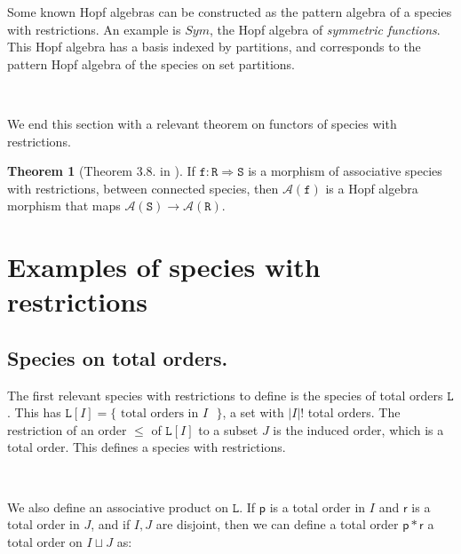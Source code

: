 \documentclass[12pt, reqno]{amsart}
\theoremstyle{definition}
\newtheorem{thm}{Theorem}[section]
\newcommand{\prR}{\mathtt{R}}
\begin{document}
Some known Hopf algebras can be constructed as the pattern algebra of a species with restrictions.
An example is $Sym$, the Hopf algebra of \textit{symmetric functions}.
This Hopf algebra has a basis indexed by partitions, and corresponds to the pattern Hopf algebra of the species on set partitions.

\

We end this section with a relevant theorem on functors of species with restrictions.

\begin{thm}[Theorem 3.8. in \cite{Penaguiao2020}]\label{thm:functoriality}
    If $\mathtt{f} : \prR \Rightarrow \mathtt{S}$ is a morphism of associative species with restrictions, between connected species, then $\mathcal A(\mathtt{f})$ is a Hopf algebra morphism that maps $\mathcal A(\mathtt{S}) \to \mathcal A(\mathtt{R})$.
\end{thm}

\section{Examples of species with restrictions \label{sec:species_restrictions}}

\subsection{Species on total orders.\label{sec:specieslinearorders}}

The first relevant species with restrictions to define is the species of total orders $\mathtt{L}$.
This has $\mathtt{L}[I] = \{\text{ total orders in $I$ }\}$, a set with $|I|!$ total orders.
The restriction of an order $\leq $ of $\mathtt{L}[I]$ to a subset $J$ is the induced order, which is a total order.
This defines a species with restrictions.

\

We also define an associative product on $\mathtt{L}$.
If $\mathsf{p}$ is a total order in $I$ and $\mathsf{r}$ is a total order in $J$, and if $I, J$ are disjoint, then we can define a total order $\mathsf{p} \ast\mathsf{r}$ a total order on $I \sqcup J$ as:
\end{document}
